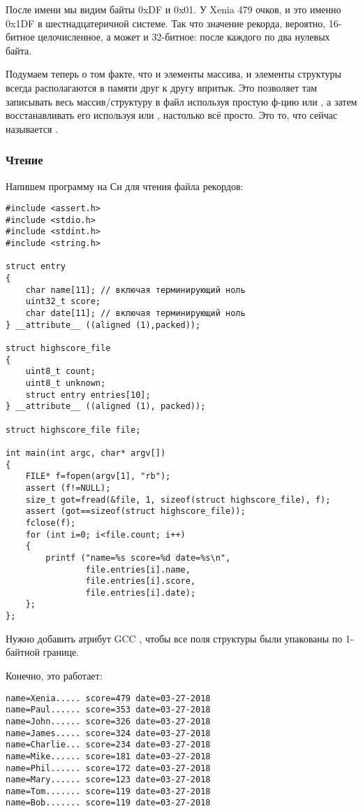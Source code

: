 После имени  мы видим байты 0xDF и 0x01.
У Xenia 479 очков, и это именно 0x1DF в шестнадцатеричной системе.
Так что значение рекорда, вероятно, 16-битное целочисленное, а может и 32-битное: после каждого по два нулевых байта.

Подумаем теперь о том факте, что и элементы массива, и элементы структуры всегда располагаются в памяти друг к другу впритык.
Это позволяет там записывать весь массив/структуру в файл используя простую ф-цию  или , 
а затем восстанавливать его используя  или , настолько всё просто.
Это то, что сейчас называется .

\subsubsection{Чтение}

Напишем программу на Си для чтения файла рекордов:

\begin{lstlisting}[style=customc]
#include <assert.h>
#include <stdio.h>
#include <stdint.h>
#include <string.h>

struct entry
{
	char name[11]; // включая терминирующий ноль
	uint32_t score;
	char date[11]; // включая терминирующий ноль
} __attribute__ ((aligned (1),packed));

struct highscore_file
{
	uint8_t count;
	uint8_t unknown;
	struct entry entries[10];
} __attribute__ ((aligned (1), packed));

struct highscore_file file;

int main(int argc, char* argv[])
{
	FILE* f=fopen(argv[1], "rb");
	assert (f!=NULL);
	size_t got=fread(&file, 1, sizeof(struct highscore_file), f);
	assert (got==sizeof(struct highscore_file));
	fclose(f);
	for (int i=0; i<file.count; i++)
	{
		printf ("name=%s score=%d date=%s\n",
				file.entries[i].name,
				file.entries[i].score,
				file.entries[i].date);
	};
};
\end{lstlisting}

Нужно добавить атрибут GCC , чтобы все поля структуры были упакованы по 1-байтной границе.

Конечно, это работает:

\begin{lstlisting}
name=Xenia..... score=479 date=03-27-2018
name=Paul...... score=353 date=03-27-2018
name=John...... score=326 date=03-27-2018
name=James..... score=324 date=03-27-2018
name=Charlie... score=234 date=03-27-2018
name=Mike...... score=181 date=03-27-2018
name=Phil...... score=172 date=03-27-2018
name=Mary...... score=123 date=03-27-2018
name=Tom....... score=119 date=03-27-2018
name=Bob....... score=119 date=03-27-2018
\end{lstlisting}

